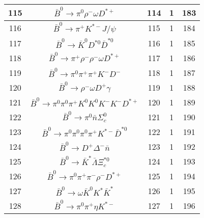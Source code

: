 \documentclass[landscape]{article}
\begin{document}
\begin{table}[htbp!]
\begin{tabular}{|c|c|c|c|c|}
\hline
115 & $ \bar{B}^{0} \rightarrow \pi^{0} \rho^{-} \omega D^{*+} $ & 114 & 1 & 183 \\
\hline
116 & $ \bar{B}^{0} \rightarrow \pi^{+} K^{*-} J/\psi $ & 115 & 1 & 184 \\
\hline
117 & $ \bar{B}^{0} \rightarrow \bar{K}^{0} D^{*0} \bar{D}^{*0} $ & 116 & 1 & 185 \\
\hline
118 & $ \bar{B}^{0} \rightarrow \pi^{+} \rho^{-} \rho^{-} \omega D^{*+} $ & 117 & 1 & 186 \\
\hline
119 & $ \bar{B}^{0} \rightarrow \pi^{0} \pi^{+} \pi^{+} K^{-} D^{-} $ & 118 & 1 & 187 \\
\hline
120 & $ \bar{B}^{0} \rightarrow \rho^{-} \omega D^{+} \gamma $ & 119 & 1 & 188 \\
\hline
121 & $ \bar{B}^{0} \rightarrow \pi^{0} \pi^{0} \pi^{+} K^{0} K^{0} K^{-} K^{-} D^{*+} $ & 120 & 1 & 189 \\
\hline
122 & $ \bar{B}^{0} \rightarrow \pi^{0} \bar{n} \Sigma_{c}^{0} $ & 121 & 1 & 190 \\
\hline
123 & $ \bar{B}^{0} \rightarrow \pi^{0} \pi^{0} \pi^{0} \pi^{+} K^{*-} \bar{D}^{*0} $ & 122 & 1 & 191 \\
\hline
124 & $ \bar{B}^{0} \rightarrow D^{+} \Delta^{-} \bar{n} $ & 123 & 1 & 192 \\
\hline
125 & $ \bar{B}^{0} \rightarrow \bar{K}^{*} \bar{\Lambda} \Xi_{c}^{*0} $ & 124 & 1 & 193 \\
\hline
126 & $ \bar{B}^{0} \rightarrow \pi^{0} \pi^{+} \pi^{-} \rho^{-} D^{*+} $ & 125 & 1 & 194 \\
\hline
127 & $ \bar{B}^{0} \rightarrow \omega \bar{K}^{0} K^{*} \bar{K}^{*} $ & 126 & 1 & 195 \\
\hline
128 & $ \bar{B}^{0} \rightarrow \pi^{0} \pi^{+} \eta K^{*-} $ & 127 & 1 & 196 \\
\hline
\end{tabular}
\end{table}

\clearpage
\end{document}
